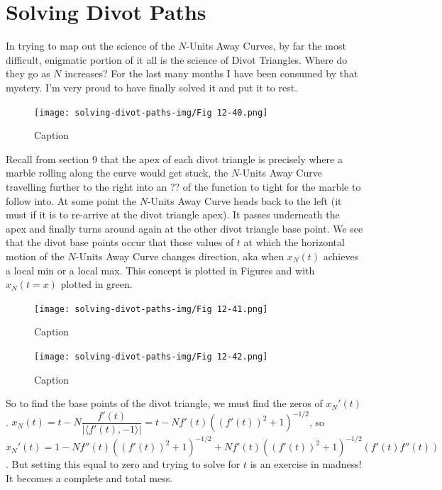 \section{Solving Divot Paths}

In trying to map out the science of the $N$-Units Away Curves, by far the most difficult, enigmatic portion of it all is the science of Divot Triangles. Where do they go as $N$ increases? For the last many months I have been consumed by that mystery. I'm very proud to have finally solved it and put it to rest.

\begin{figure}
  \texttt{[image: solving-divot-paths-img/Fig 12-40.png]}
  \caption{Caption}
  \label{fig:fig12-40}
\end{figure}

Recall from section 9 that the apex of each divot triangle is precisely where a marble rolling along the curve would get stuck, the $N$-Units Away Curve travelling further to the right into an ?? of the function to tight for the marble to follow into. At some point the $N$-Units Away Curve heads back to the left (it must if it is to re-arrive at the divot triangle apex). It passes underneath the apex and finally turns around again at the other divot triangle base point. We see that the divot base points occur that those values of $t$ at which the horizontal motion of the $N$-Units Away Curve changes direction, aka when $x_N(t)$ achieves a local min or a local max. This concept is plotted in Figures and with $x_N(t=x)$ plotted in green.

\begin{figure}[H]
    \centering
    \begin{minipage}[b]{0.5\linewidth}
        \texttt{[image: solving-divot-paths-img/Fig 12-41.png]}
        \caption{Caption}
        \label{fig:fig12-41}
    \end{minipage}
    \begin{minipage}[b]{0.5\linewidth}
        \texttt{[image: solving-divot-paths-img/Fig 12-42.png]}
        \caption{Caption}
        \label{fig:fig12-42}
    \end{minipage}
\end{figure}

So to find the base points of the divot triangle, we must find the zeros of $x_N'(t)$. $x_N(t) = t - N \dfrac{f'(t)}{| \langle f'(t), -1 \rangle|} = t - N f'(t) (( f'(t))^2 + 1) ^ {-1/2}$, so $x_N'(t) = 1 - N f''(t) ((f'(t))^2 + 1) ^ {-1/2} + N f'(t) ((f'(t))^2 + 1) ^ {-1/2}(f'(t) f''(t))$. But setting this equal to zero and trying to solve for $t$ is an exercise in madness! It becomes a complete and total mess.

